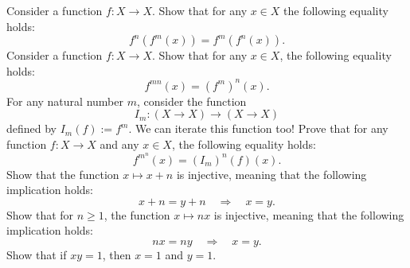 \begin{foundational}
  \exercise Consider a function $f:X \to X$. Show that for any $x\in X$ the following equality holds:
  \begin{equation*}
    f^n(f^m(x))=f^m(f^n(x)).
  \end{equation*}
  \exercise Consider a function $f:X \to X$. Show that for any $x\in X$, the following equality holds:
  \begin{equation*}
    f^{mn}(x)=(f^m)^n(x).
  \end{equation*}
  \exercise For any natural number $m$, consider the function
  \begin{equation*}
    I_m : (X\to X) \to (X\to X)
  \end{equation*}
  defined by $I_m(f):= f^m$. We can iterate this function too! Prove that for any function $f:X\to X$ and any $x\in X$, the following equality holds:
  \begin{equation*}
    f^{m^n}(x) = (I_m)^n(f)(x).
  \end{equation*}
  \exercise Show that the function $x\mapsto x+n$ is injective, meaning that the following implication holds:
  \begin{equation*}
    x+n=y+n\quad\Rightarrow\quad x=y.
  \end{equation*}
  \exercise Show that for $n\geq 1$, the function $x\mapsto nx$ is injective, meaning that the following implication holds:
  \begin{equation*}
    nx = ny \quad\Rightarrow\quad x=y.
  \end{equation*}
  \exercise Show that if $xy=1$, then $x=1$ and $y=1$.
\end{foundational}

